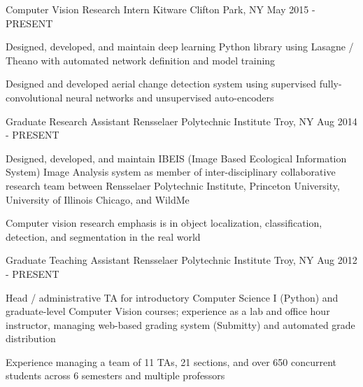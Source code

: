 

\begin{cventries}

  \cventry
    {Computer Vision Research Intern} %
    {Kitware} %
    {Clifton Park, NY} %
    {May 2015 - PRESENT} %
    {
      \begin{cvitems} %
        \item {Designed, developed, and maintain deep learning Python library using Lasagne / Theano with automated network definition and model training}
        \item {Designed and developed aerial change detection system using supervised fully-convolutional neural networks and unsupervised auto-encoders}
      \end{cvitems}
    }

\ifresume
\else
    \cventry
      {Graduate Research Assistant} %
      {Rensselaer Polytechnic Institute} %
      {Troy, NY} %
      {Aug 2014 - PRESENT} %
      {
        \begin{cvitems} %
          \item {Designed, developed, and maintain IBEIS (Image Based Ecological Information System) Image Analysis system as member of inter-disciplinary collaborative research team between Rensselaer Polytechnic Institute, Princeton University, University of Illinois Chicago, and WildMe}
          \item {Computer vision research emphasis is in object localization, classification, detection, and segmentation in the real world}
        \end{cvitems}
      }
\fi

  \cventry
    {Graduate Teaching Assistant} %
    {Rensselaer Polytechnic Institute} %
    {Troy, NY} %
    {Aug 2012 - PRESENT} %
    {
      \begin{cvitems} %
        \item {Head / administrative TA for introductory Computer Science I (Python) and graduate-level Computer Vision courses; experience as a lab and office hour instructor, managing web-based grading system (Submitty) and automated grade distribution}
        \item {Experience managing a team of 11 TAs, 21 sections, and over 650 concurrent students across 6 semesters and multiple professors}
      \end{cvitems}
    }


\end{cventries}
